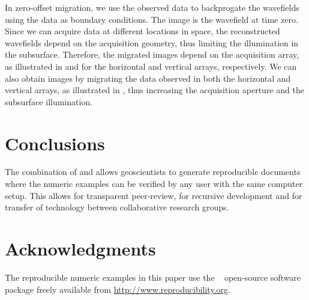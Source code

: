 
In zero-offset migration, we use the observed data to backprogate the
wavefields using the data as boundary conditions. The image is the
wavefield at time zero. Since we can acquire data at different
locations in space, the reconstructed wavefields depend on the
acquisition geometry, thus limiting the illumination in the
subsurface. Therefore, the migrated images depend on the acquisition
array, as illustrated in  and  for the horizontal
and vertical arrays, respectively. 
We can also obtain images by migrating the data observed in both the
horizontal and vertical arrays, as illustrated in , thus
increasing the acquisition aperture and the subsurface illumination.



\section{Conclusions}
The combination of \latex and \mg allows geoscientists to generate
reproducible documents where the numeric examples can be verified by
any user with the same computer setup. This allows for transparent
peer-review, for recursive development and for transfer of technology
between collaborative research groups.

\section{Acknowledgments}
The reproducible numeric examples in this paper use the \mg~
open-source software package freely available from
\url{http://www.reproducibility.org}.


